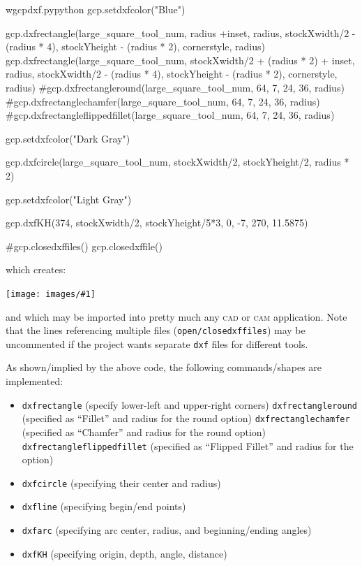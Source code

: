 \documentclass{ltxdoc}
\newcommand{\includeimage}[1]{\bigskip\noindent\texttt{[image: images/\#1]}\bigskip}
\begin{document}
\begin{writecode}{w}{gcpdxf.py}{python}
gcp.setdxfcolor("Blue")

gcp.dxfrectangle(large_square_tool_num, radius +inset, radius, stockXwidth/2 - (radius * 4), stockYheight - (radius * 2), cornerstyle, radius) 
gcp.dxfrectangle(large_square_tool_num, stockXwidth/2 + (radius * 2) + inset, radius, stockXwidth/2 - (radius * 4), stockYheight - (radius * 2), cornerstyle, radius) 
#gcp.dxfrectangleround(large_square_tool_num, 64, 7, 24, 36, radius)
#gcp.dxfrectanglechamfer(large_square_tool_num, 64, 7, 24, 36, radius)
#gcp.dxfrectangleflippedfillet(large_square_tool_num, 64, 7, 24, 36, radius)

gcp.setdxfcolor("Dark Gray")

gcp.dxfcircle(large_square_tool_num, stockXwidth/2, stockYheight/2, radius * 2)

gcp.setdxfcolor("Light Gray")

gcp.dxfKH(374, stockXwidth/2, stockYheight/5*3, 0, -7, 270, 11.5875)

#gcp.closedxffiles()
gcp.closedxffile()

\end{writecode}
\addtocounter{gcpdxfpy}{84}

\noindent which creates:

\bigskip

\includeimage{gcpdxf.pdf}

\bigskip

\noindent and which may be imported into pretty much any \textsc{cad} or \textsc{cam} application. Note that the lines referencing multiple files (\verb|open/closedxffiles|) may be uncommented if the project wants separate \verb|dxf| files for different tools.

As shown/implied by the above code, the following commands/shapes are implemented:

\begin{itemize}
\item \verb|dxfrectangle| (specify lower-left and upper-right corners)
\subitem\verb|dxfrectangleround| (specified as ``Fillet'' and radius for the round option)
\subitem\verb|dxfrectanglechamfer| (specified as ``Chamfer'' and radius for the round option)
\subitem\verb|dxfrectangleflippedfillet| (specified as ``Flipped Fillet'' and radius for the option)
\item \verb|dxfcircle| (specifying their center and radius)
\item \verb|dxfline| (specifying begin/end points)
\item \verb|dxfarc| (specifying arc center, radius, and beginning/ending angles)
\item \verb|dxfKH| (specifying origin, depth, angle, distance)
 \end{itemize}
\end{document}
